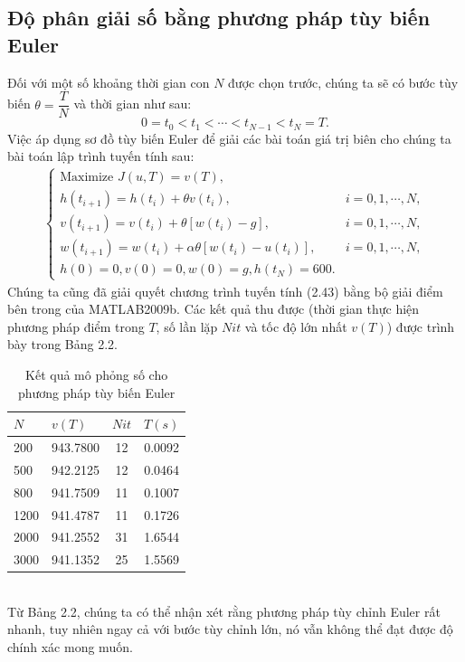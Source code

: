 \documentclass[12pt,a4paper]{report}
\begin{document}
	\subsection{Độ phân giải số bằng phương pháp tùy biến Euler}
	Đối với một số khoảng thời gian con $N$ được chọn trước, chúng ta sẽ có bước tùy biến $\theta = \dfrac{T}{N}$ và thời gian như sau: $$0 = t_0 < t_1 < \cdots < t_{N-1} < t_N = T.$$
	Việc áp dụng sơ đồ tùy biến Euler để giải các bài toán giá trị biên cho chúng ta bài toán lập trình tuyến tính sau:
	\begin{eqnarray}
		\begin{cases}
			\text{Maximize } J(u, T) = v(T), \\ h(t_{i+1}) = h(t_i) + \theta v(t_i), & i = 0,1,\cdots, N, \\ v(t_{i+1}) = v(t_i) + \theta[w(t_i) - g], & i=0,1,\cdots, N, \\ w(t_{i+1}) = w(t_i) + \alpha\theta[w(t_i) - u(t_i)],& i = 0,1,\cdots, N, \\ h(0) = 0, v(0) = 0, w(0) = g, h(t_N) = 600. 
		\end{cases}
	\end{eqnarray}
	Chúng ta cũng đã giải quyết chương trình tuyến tính (2.43) bằng bộ giải điểm bên trong của MATLAB2009b. Các kết quả thu được (thời gian thực hiện phương pháp điểm trong $T$, số lần lặp $Nit$ và tốc độ lớn nhất $v(T)$) được trình bày trong Bảng 2.2.
	\begin{table}[!thp]
		\centering
	\begin{tabular}{|l|l|c|c|}
		\hline
		$N$ & $v(T)$ & $Nit$ & $T(s)$ \\
		\hline
		200 & 943.7800 & 12 & 0.0092 \\
		\hline
		500 & 942.2125 & 12 & 0.0464 \\
		\hline
		800 & 941.7509 & 11 & 0.1007 \\
		\hline
		1200 & 941.4787 & 11 & 0.1726 \\
		\hline
		2000 & 941.2552 & 31 & 1.6544 \\
		\hline
		3000 & 941.1352 & 25 & 1.5569 \\
		\hline
	\end{tabular}
\caption{Kết quả mô phỏng số cho phương pháp tùy biến Euler}
	\end{table} \\
Từ Bảng 2.2, chúng ta có thể nhận xét rằng phương pháp tùy chỉnh Euler rất nhanh, tuy nhiên ngay cả với bước tùy chỉnh lớn, nó vẫn không thể đạt được độ chính xác mong muốn.
\end{document}
